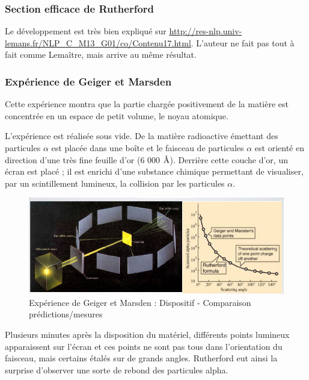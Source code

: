     \subsubsection{Section efficace de Rutherford}
    
    Le développement est très bien expliqué sur \url{http://res-nlp.univ-lemans.fr/NLP_C_M13_G01/co/Contenu17.html}. L'auteur ne fait pas tout à fait comme Lemaître, mais arrive au même résultat.
    
    \subsubsection{Expérience de Geiger et Marsden}

    Cette expérience montra que la partie chargée positivement de la matière est concentrée en un espace de petit volume, le noyau atomique. 
    
    \vspace{0.2cm}

    L'expérience est réalisée sous vide. De la matière radioactive émettant des particules $\alpha$ est placée dans une boîte et le faisceau de particules $\alpha$ est orienté en direction d'une très fine feuille d'or (6 000 $\textup{\AA}$). Derrière cette couche d'or, un écran est placé ; il est enrichi d'une substance chimique permettant de visualiser, par un scintillement lumineux, la collision par les particules $\alpha$.
    
    \begin{figure}[ht]
        \centering
        \includegraphics[scale=0.75]{Images1/geiger.PNG}
        \caption{Expérience de Geiger et Marsden : Dispositif - Comparaison prédictions/mesures}
    \end{figure}

    Plusieurs minutes après la disposition du matériel, différents points lumineux apparaissent sur l'écran et ces points ne sont pas tous dans l'orientation du faisceau, mais certains étalés sur de grands angles. Rutherford eut ainsi la surprise d'observer une sorte de rebond des particules alpha.
    
